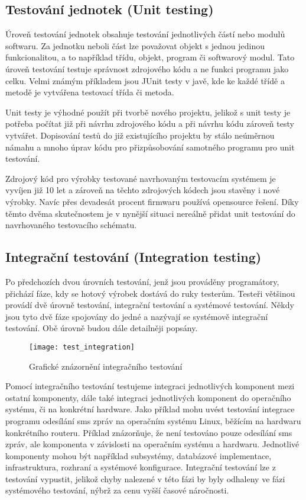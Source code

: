 \subsection{Testování jednotek (Unit testing)}
Úroveň testování jednotek obsahuje testování jednotlivých částí nebo modulů softwaru. Za jednotku neboli část lze považovat objekt s jednou jedinou funkcionalitou, a to například třídu, objekt, program či softwarový modul. Tato úroveň testování testuje správnost zdrojového kódu a ne funkci programu jako celku. Velmi známým příkladem jsou JUnit testy v javě, kde ke každé třídě a metodě je vytvářena testovací třída či metoda.

Unit testy je výhodné použít při tvorbě nového projektu, jelikož s unit testy je potřeba počítat již při návrhu zdrojového kódu a při návrhu kódu zároveň testy vytvářet. Dopisování testů do již existujícího projektu by stálo neúměrnou námahu a mnoho úprav kódu pro přizpůsobování samotného programu pro unit testování.

Zdrojový kód pro výrobky testované navrhovaným testovacím systémem je vyvíjen již 10 let a zároveň na těchto zdrojových kódech jsou stavěny i nové výrobky. Navíc přes devadesát procent firmwaru používá opensource řešení. Díky těmto dvěma skutečnostem je v nynější situaci nereálně přidat unit testování do navrhovaného testovacího schématu.

\subsection{Integrační testování (Integration testing)}
Po předchozích dvou úrovních testování, jenž jsou prováděny programátory, přichází fáze, kdy se hotový výrobek dostává do ruky testerům. Testeři většinou provádí dvě úrovně testování, integrační testování a systémové testování. Někdy jsou tyto dvě fáze spojovány do jedné a nazývají se systémově integrační testování. Obě úrovně budou dále detailněji popsány.

\begin{figure}[h]
  \centering
  \texttt{[image: test\_integration]}
  \caption{Grafické znázornění integračního testování}
  \label{fig:test_integration}
\end{figure}

Pomocí integračního testování testujeme integraci jednotlivých komponent mezi ostatní komponenty, dále také integraci jednotlivých komponent do operačního systému, či na konkrétní hardware. Jako příklad mohu uvést testování integrace programu odesílání sms zpráv na operačním systému Linux, běžícím na hardwaru konkrétního routeru. Příklad znázorňuje, že není testováno pouze odesílání sms zpráv, ale komponenta v závislosti na operačním systému a hardwaru. Jednotlivé komponenty mohou být například subsystémy, databázové implementace, infrastruktura, rozhraní a systémové konfigurace. Integrační testování lze z testování vypustit, jelikož chyby nalezené v této fázi by byly odhaleny ve fázi systémového testování, nýbrž za cenu vyšší časové náročnosti.

